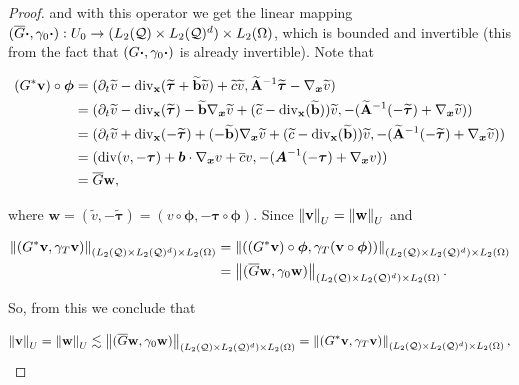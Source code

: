 \begin{proof}
and with this operator we get the linear mapping $(\overline{G}\boldsymbol{\cdot},\gamma_0\boldsymbol{\cdot}):U_0\to(L_2(\mathcal{Q})\times L_2(\mathcal{Q})^d)\times L_2(\Omega)$, which is bounded and invertible (this from the fact that $(G\boldsymbol{\cdot},\gamma_0\boldsymbol{\cdot})$ is already invertible). Note that 


\begin{align*}
    (G^*\mathbf{v})\circ\boldsymbol{\phi}&=(\partial_t\widetilde{v}-\operatorname{div}_{\mathbf{x}}(\widetilde{\boldsymbol{\tau}}+\widetilde{\mathbf{b}}\widetilde{v})+\widetilde{c}\widetilde{v},\widetilde{\mathbf{A}}^{-1}\widetilde{\boldsymbol{\tau}}-\nabla_{\boldsymbol{x}}\widetilde{v})\\&=(\partial_t\widetilde{v}-\operatorname{div}_{\mathbf{x}}(\widetilde{\boldsymbol{\tau}})-\widetilde{\mathbf{b}}\nabla_{\boldsymbol{x}}\widetilde{v}+(\widetilde{c}-\operatorname{div}_{\mathbf{x}}(\widetilde{\mathbf{b}}))\widetilde{v},-(\widetilde{\mathbf{A}}^{-1}(-\widetilde{\boldsymbol{\tau}})+\nabla_{\boldsymbol{x}}\widetilde{v}))\\&=(\partial_t\widetilde{v}+\operatorname{div}_{\mathbf{x}}(-\widetilde{\boldsymbol{\tau}})+(-\widetilde{\mathbf{b}})\nabla_{\boldsymbol{x}}\widetilde{v}+(\widetilde{c}-\operatorname{div}_{\mathbf{x}}(\widetilde{\mathbf{b}}))\widetilde{v},-(\widetilde{\mathbf{A}}^{-1}(-\widetilde{\boldsymbol{\tau}})+\nabla_{\boldsymbol{x}}\widetilde{v}))\\&=(\operatorname{div}(v,-\boldsymbol{\tau})+\boldsymbol{b}\cdot\nabla_{\boldsymbol{x}} v+\overline{c}v,-(\boldsymbol{A}^{-1}(-\boldsymbol{\tau})+\nabla_{\boldsymbol{x}} v))\\&=\overline{G}\mathbf{w},
\end{align*}

where $\mathbf{w}=(\widetilde{v},-\widetilde{\boldsymbol{\tau}})=(v\circ\boldsymbol{\phi},-\boldsymbol{\tau}\circ\boldsymbol{\phi})$. Since $\left\lVert\mathbf{v} \right\rVert_U=\left\lVert\mathbf{w} \right\rVert_U$ and 

\begin{align*}
    \left\lVert(G^*\mathbf{v},\gamma_T\mathbf{v}) \right\rVert_{(L_2(\mathcal{Q})\times L_2(\mathcal{Q})^d)\times L_2(\Omega)}&=\left\lVert((G^*\mathbf{v})\circ\boldsymbol{\phi},\gamma_T(\mathbf{v}\circ\boldsymbol{\phi})) \right\rVert_{(L_2(\mathcal{Q})\times L_2(\mathcal{Q})^d)\times L_2(\Omega)}\\&=\left\lVert(\overline{G}\mathbf{w},\gamma_0\mathbf{w}) \right\rVert_{(L_2(\mathcal{Q})\times L_2(\mathcal{Q})^d)\times L_2(\Omega)}.
\end{align*}

So, from this we conclude that

$$\left\lVert\mathbf{v} \right\rVert_U=\left\lVert\mathbf{w} \right\rVert_U\lesssim\left\lVert(\overline{G}\mathbf{w},\gamma_0\mathbf{w}) \right\rVert_{(L_2(\mathcal{Q})\times L_2(\mathcal{Q})^d)\times L_2(\Omega)}=\left\lVert(G^*\mathbf{v},\gamma_T\mathbf{v}) \right\rVert_{(L_2(\mathcal{Q})\times L_2(\mathcal{Q})^d)\times L_2(\Omega)},$$



\end{proof}
